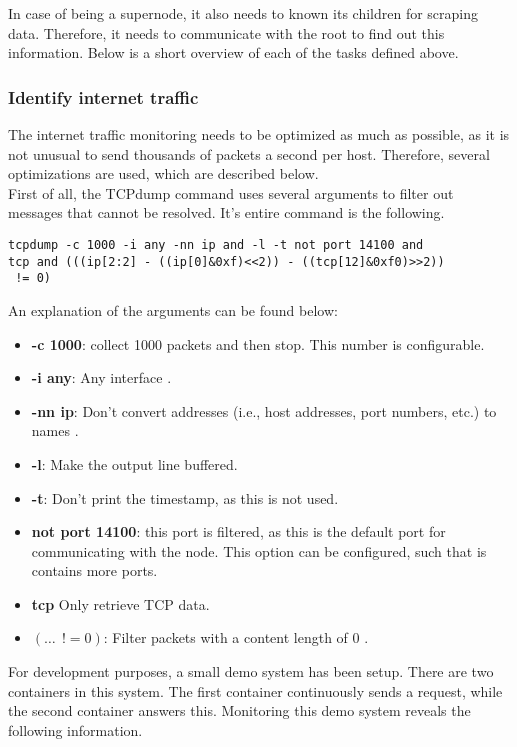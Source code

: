 In case of being a supernode, it also needs to known its children for scraping data. Therefore, it needs to communicate with the root to find out this information. Below is a short overview of each of the tasks defined above.

\subsubsection{Identify internet traffic}
The internet traffic monitoring needs to be optimized as much as possible, as it is not unusual to send thousands of packets a second per host. Therefore, several optimizations are used, which are described below.\\

\noindent
First of all, the TCPdump command uses several arguments to filter out messages that cannot be resolved. It's entire command is the following.
\begin{verbatim}
tcpdump -c 1000 -i any -nn ip and -l -t not port 14100 and
tcp and (((ip[2:2] - ((ip[0]&0xf)<<2)) - ((tcp[12]&0xf0)>>2))
 != 0)
\end{verbatim}
An explanation of the arguments can be found below:
\begin{itemize}
    \item \textbf{-c 1000}: collect 1000 packets and then stop. This number is configurable.
    \item \textbf{-i any}: Any interface \cite{tcpmanpage}.
    \item \textbf{-nn ip}: Don't convert addresses (i.e., host addresses, port numbers, etc.) to names \cite{tcpmanpage}.
    \item \textbf{-l}: Make the output line buffered.
    \item \textbf{-t}: Don't print the timestamp, as this is not used.
    \item \textbf{not port 14100}: this port is filtered, as this is the default port for communicating with the node. This option can be configured, such that is contains more ports.
    \item \textbf{tcp} Only retrieve TCP data.
    \item \textbf{$(\dots~~!= 0)$}: Filter packets with a content length of 0 \cite{tcpdump-filter}.
\end{itemize}
For development purposes, a small demo system has been setup. There are two containers in this system. The first container continuously sends a request, while the second container answers this. Monitoring this demo system reveals the following information.
